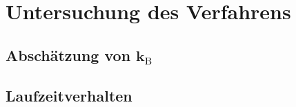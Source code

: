 \section{Untersuchung des Verfahrens}
\subsection{\texorpdfstring{Abschätzung von $\bm{k_\mathrm{B}}$}{Abschätzung von kB}}
\subsection{Laufzeitverhalten}
